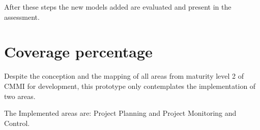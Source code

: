 After these steps the new models added are evaluated and present in the assessment.

\section{Coverage percentage} \label{sec:coverage}



Despite the conception and the mapping of all areas from maturity level 2 of CMMI for development, this prototype only contemplates the implementation of two areas.

The Implemented areas are: Project Planning and Project Monitoring and Control.